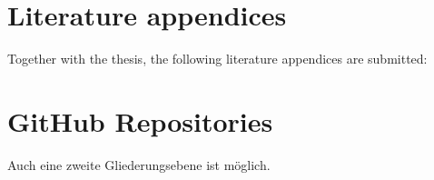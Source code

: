 \section{Literature appendices}
Together with the thesis, the following literature appendices are submitted:
\section{GitHub Repositories}
Auch eine zweite Gliederungsebene ist möglich.